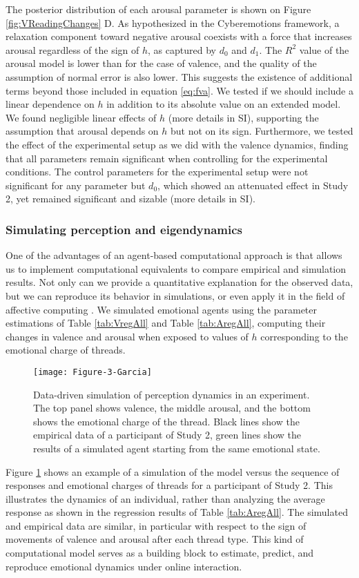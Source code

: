 \documentclass[nologo,url,11pt,a4paper]{ETHpaper}
\begin{document}
The posterior distribution of each arousal parameter is shown on Figure  \ref{fig:VReadingChanges} D.  As hypothesized in the Cyberemotions framework,  a relaxation component toward negative arousal coexists with a force that increases arousal regardless of the sign of $h$, as captured by  $d_0$ and
$d_1$.  
The $R^2$ value of the arousal model is lower than for the case of valence, and the quality of the assumption of normal error is also lower.
This suggests the existence of additional terms  beyond those included in equation \ref{eq:fva}.
We tested if we should include a linear dependence on $h$  in addition to its absolute value on an extended model.
We found negligible linear effects of $h$ (more details in SI), supporting the assumption that arousal depends on $h$ but not on its sign.
Furthermore, we tested the effect of the experimental setup as
we did with the valence dynamics, finding that all parameters  remain
significant when controlling for the experimental conditions.  The control
parameters for the experimental setup were not significant for any parameter
but $d_0$, which showed an attenuated effect in Study 2, yet remained
significant and sizable (more details in SI).

\subsubsection{Simulating perception and eigendynamics}

One of the advantages of an agent-based computational approach is that allows us to
implement computational equivalents to compare empirical and simulation
results. Not only can we provide a quantitative explanation for the observed
data, but we can reproduce its behavior in simulations, or even apply it in
the field of affective computing \cite{Rank2013}.  We simulated emotional
agents using the parameter estimations of Table \ref{tab:VregAll} and Table
\ref{tab:AregAll}, computing their changes in valence and arousal when exposed
to values of $h$ corresponding to the emotional charge of threads. 
\begin{figure}[ht]
\centering
\texttt{[image: Figure-3-Garcia]}
\caption{Data-driven simulation of perception dynamics in an experiment. 
The top panel shows valence, the middle arousal, and the bottom shows the emotional charge of the thread. 
Black lines show the empirical data of a participant of Study 2, green lines show the results of a simulated agent starting from the same emotional state. \label{fig:Simulation} } \end{figure}
Figure \ref{fig:Simulation} shows an example of a simulation of the model
versus the sequence of responses and emotional charges of threads for a
participant of Study 2. 
This illustrates the dynamics of an individual, rather than analyzing the average
response as shown in the regression results of Table \ref{tab:AregAll}.
The simulated and empirical data are similar, in
particular with respect to the sign of movements of valence and arousal after
each thread type. This kind of computational model serves as a building block
to estimate, predict, and reproduce emotional dynamics under online
interaction.
\end{document}
